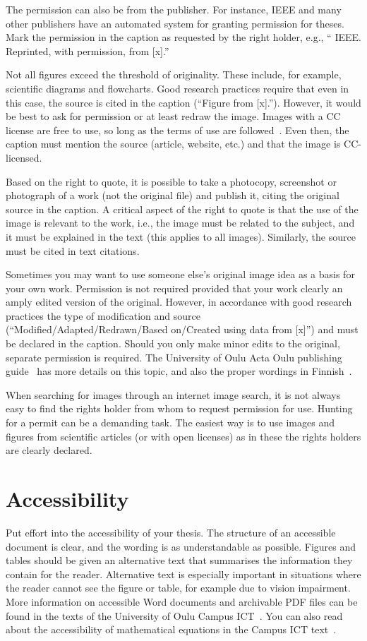 The permission can also be from the publisher. For instance, IEEE and
many other publishers have an automated system for granting permission
for theses. Mark the permission in the caption as requested by the
right holder, e.g., “ IEEE. Reprinted, with
permission, from [x].''

Not all figures exceed the threshold of originality. These include,
for example, scientific diagrams and flowcharts. Good research
practices require that even in this case, the source is cited in the
caption (\enquote{Figure from [x].}). However, it would be best to ask
for permission or at least redraw the image. Images with a CC license
are free to use, so long as the terms of use are
followed~\cite{about_cc_licenses}. Even then, the caption must mention
the source (article, website, etc.) and that the image is CC-licensed.

Based on the right to quote, it is possible to take a photocopy,
screenshot or photograph of a work (not the original file) and publish
it, citing the original source in the caption. A critical aspect of
the right to quote is that the use of the image is relevant to the
work, i.e., the image must be related to the subject, and it must be
explained in the text (this applies to all images). Similarly, the
source must be cited in text citations.

Sometimes you may want to use someone else's original image idea as a
basis for your own work. Permission is not required provided that your
work clearly an amply edited version of the original. However, in
accordance with good research practices the type of modification and
source (``Modified/Adapted/Redrawn/Based on/Created using data from
[x]'') and must be declared in the caption. Should you only make minor
edits to the original, separate permission is required. The University
of Oulu Acta Oulu publishing guide~\cite{ronkainen_copyright} has more
details on this topic, and also the proper wordings in
Finnish~\cite{ronkainen_tekijanoikeus}.

When searching for images through an internet image search, it is not
always easy to find the rights holder from whom to request permission
for use. Hunting for a permit can be a demanding task. The easiest way
is to use images and figures from scientific articles (or with open
licenses) as in these the rights holders are clearly declared.

\section{Accessibility}
\label{accessibility}
Put effort into the accessibility of your thesis. The
structure of an accessible document is clear, and the wording is as
understandable as possible. Figures and tables should be given an
alternative text that summarises the information they contain for the
reader. Alternative text is especially important in situations where
the reader cannot see the figure or table, for example due to vision
impairment.  More information on accessible Word documents and
archivable PDF files can be found in the texts of the University of
Oulu Campus ICT~\cite{ictaccessibleword,ictwordpdfa}. You can also
read about the accessibility of mathematical equations in the Campus
ICT text~\cite{ictaccessiblemath}.
